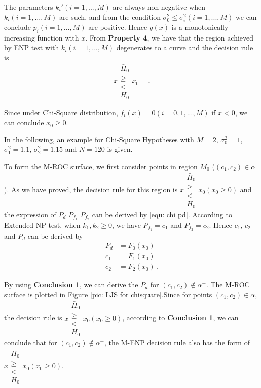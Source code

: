 \documentclass[12pt,journal,a4paper,twoside,onecolumn]{IEEEtran}
\begin{document}
\begin{spacing}{2.5}
The parameters $k_i' (i=1, ..., M)$ are always non-negative when $k_i (i=1, ..., M)$ are such, and from 
 the condition $\sigma_0^2 \leq \sigma_i^2 (i=1, ..., M)$ we can conclude $p_i (i=1, ..., M)$ are positive. Hence $g(x)$ is a monotonically increasing function with $x$. From \textbf{Property 4}, we have that the region achieved by ENP test with $k_i (i = 1, ..., M)$ degenerates to a curve and the decision rule is
\begin{equation}
  \label{equ: decision rule chi 2}
  x \substack{\bar{H}_0 \\ \geq \\ < \\ H_0} x_0\;\;\;\;\,.
\end{equation}

Since under Chi-Square distribution, $f_i(x) =0 (i = 0, 1, ..., M)$ if $x<0$, we can conclude $x_0 \geq 0$.

In the following, an example for Chi-Square Hypotheses with $M=2$, $\sigma_0^2 = 1$, $\sigma_1^2 = 1.1$, $\sigma_2^2 = 1.15$ and $N=120$ is given.

To form the M-ROC surface, we first consider points in region $M_0$ ($(c_1, c_2) \in \alpha$). As we have proved, the decision rule for this region is $x \substack{\bar{H}_0 \\\geq\\< \\ H_0 } x_0 (x_0 \geq 0)$ and the expression of $P_d$ $P_{f_1}$ $P_{f_2}$ can be derived by \eqref{equ: chi pd}.  According to Extended NP test, when $k_1, k_2 \geq 0$, we have $P_{f_1} = c_1$ and $P_{f_2} = c_2$. Hence $c_1$, $c_2$ and $P_d$ can be derived by
\begin{equation}
\begin{split}
P_d &= F_0(x_0)\\
c_1 &= F_1(x_0)\\
c_2 &= F_2(x_0)\,.
\end{split}
\end{equation}

By using \textbf{Conclusion 1}, we can derive the $P_d$ for $(c_1, c_2) \notin \alpha^+$.
The M-ROC surface is plotted in Figure \ref{pic: LJS for chisquare}.Since for points $(c_1, c_2) \in \alpha$, the decision rule is  $x \substack{\bar{H}_0 \\\geq\\< \\ H_0 } x_0 (x_0 \geq 0)$, according to \textbf{Conclusion 1}, we can conclude that for $(c_1, c_2) \notin \alpha^+$, the M-ENP decision rule also has the form of $x \substack{\bar{H}_0 \\\geq\\< \\ H_0 } x_0 (x_0 \geq 0)$.  

\end{spacing}
\end{document}
